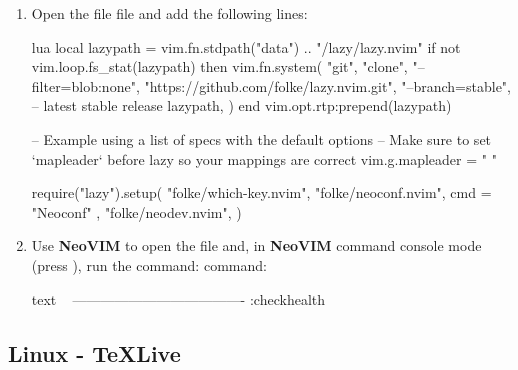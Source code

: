 \begin{enumerate}
    \begin{mintedbox}{bash}
<root == ~/.config/nvim>
| init.lua
|_ lua
    |_ config
    |   |_ init.lua
    |_ plugins
    |_ util
    \end{mintedbox}
    \item Open the file  file and add the following
    lines:
    \begin{mintedbox}{lua}
local lazypath = vim.fn.stdpath("data") .. "/lazy/lazy.nvim"
if not vim.loop.fs_stat(lazypath) then
  vim.fn.system({
    "git",
    "clone",
    "--filter=blob:none",
    "https://github.com/folke/lazy.nvim.git",
    "--branch=stable", -- latest stable release
    lazypath,
  })
end
vim.opt.rtp:prepend(lazypath)

-- Example using a list of specs with the default options
-- Make sure to set `mapleader` before lazy so your mappings are correct
vim.g.mapleader = " "

require("lazy").setup({
  "folke/which-key.nvim",
  { "folke/neoconf.nvim", cmd = "Neoconf" },
  "folke/neodev.nvim",
})
    \end{mintedbox}
    \item Use \textbf{NeoVIM} to open the file and, in \textbf{NeoVIM} command
    console mode (press ), run the command:
    command:
    \begin{mintedbox}{text}
~
-------------------------------------
:checkhealth
    \end{mintedbox}
\end{enumerate}


\subsection{Linux - TeXLive}

